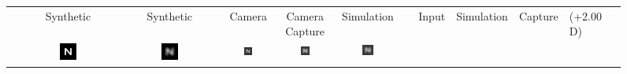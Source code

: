 
\begin{figure}[!t]
	\centering

	\begin{tabular}{@{}r@{ } c@{ } c@{ } c@{ } c@{ } c }
	&
	\small{Synthetic} &
	\small{Synthetic } &
	\small{Camera} &
	\small{Camera Capture} &
	\small{Simulation} & 
	&
	\small{Input} &
	\small{Simulation} &
	\small{Capture} &
	\small{(+2.00 D)} &
	\small{} & \\

	\begin{sideways} \parbox[b]{20mm} {} \end{sideways} &
	\includegraphics[width=0.185\textwidth]{__Images/05/BW_NCKZO_myopia/bw_N_20-200_Sloan@4x} &
	\includegraphics[width=0.185\textwidth]{__Images/05/BW_NCKZO_myopia/bw_N_20-200_Sloan@4x+2,00D(simulated)} &
	\includegraphics[width=0.185\textwidth]{__Images/05/BW_NCKZO_myopia/bw_N_20-200_Camera+0,00D} &
	\includegraphics[width=0.185\textwidth]{__Images/05/BW_NCKZO_myopia/bw_N_20-200_Camera+2,00D(lens)} &
	\includegraphics[width=0.185\textwidth]{__Images/05/BW_NCKZO_myopia/bw_N_20-200_Camera+2,00D(simulated)} \\


\end{tabular}
\end{figure}
